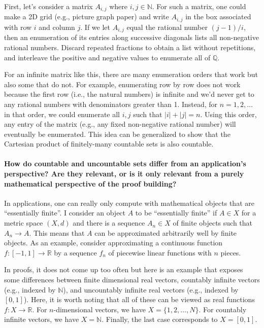 \documentclass[10pt,english]{article}
\begin{document}
First, let's consider a matrix $A_{i,j}$ where $i,j \in \mathbb{N}$.
For such a matrix, one could make a 2D grid (e.g., picture graph paper) and write $A_{i,j}$ in the box associated with row $i$ and column $j$.
If we let $A_{i,j}$ equal the rational number $(j-1)/i$, then an enumeration of its entries along successive diagonals lists all non-negative rational numbers. Discard repeated fractions to obtain a list without repetitions, and interleave the positive and negative values to enumerate all of $\mathbb{Q}$.

For an infinite matrix like this, there are many enumeration orders that work but also some that do not.
For example, enumerating row by row does not work because the first row (i.e., the natural numbers) is infinite and we'd never get to any rational numbers with denominators greater than 1.
Instead, for $n=1,2,\ldots$ in that order, we could enumerate all $i,j$ such that $|i|+|j|=n$.
Using this order, any entry of the matrix (e.g., any fixed non-negative rational number) will eventually be enumerated.
This idea can be generalized to show that the Cartesian product of finitely-many countable sets is also countable.

\paragraph{How do countable and uncountable sets differ from an application's perspective? Are they relevant, or is it only relevant from a purely mathematical perspective of the proof building?}

In applications, one can really only compute with mathematical objects that are ``essentially finite''.
I consider an object $A$ to be ``essentially finite'' if $A \in X$ for a metric space $(X,d)$ and there is a sequence $A_n \in X$ of finite objects such that $A_n \to A$.
This means that $A$ can be approximated arbitrarily well by finite objects.
As an example, consider approximating a continuous function $f\colon [-1,1] \to \mathbb{R}$ by a sequence $f_n$ of piecewise linear functions with $n$ pieces.

In proofs, it does not come up too often but here is an example that exposes some differences between finite dimensional real vectors, countably infinite vectors (e.g., indexed by $\mathbb{N}$), and uncountably infinite real vectors (e.g., indexed by $[0,1]$).
Here, it is worth noting that all of these can be viewed as real functions $f\colon X \to \mathbb{R}$.
For $n$-dimensional vectors, we have $X =  \{1,2,\ldots,N\}$.
For countably infinite vectors, we have $X=\mathbb{N}$.
Finally, the last case corresponds to $X=[0,1]$.
\end{document}
